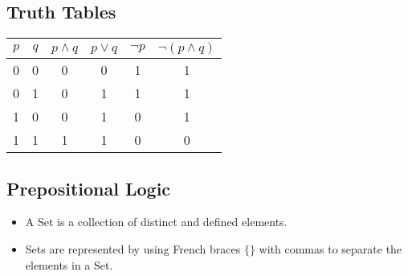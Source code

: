 \documentclass[12pt]{article}
\begin{document}
\subsection{Truth Tables}
{
\Large
\begin{center}
\begin{tabular}{|c|c||c|c||c|c|}
\hline $p$ & $q$ & $p \wedge q$ & $p\vee q$ & $\neg p$  & $\neg (p \wedge q)$ \\ 
\hline 0 & 0 & 0 & 0 & 1 & 1 \\ 
\hline 0 & 1 & 0 & 1 & 1 & 1 \\ 
\hline 1 & 0 & 0 & 1 & 0 & 1 \\ 
\hline 1 & 1 & 1 & 1 & 0 & 0 \\ 
\hline 
\end{tabular} 
\end{center}
}

\subsection*{Prepositional Logic}

\begin{itemize}
\item A Set is a collection of distinct and defined elements. 
\item Sets are represented by using French braces $\{ \}$ with commas to separate the elements in a Set. 
\end{itemize}
\end{document}
